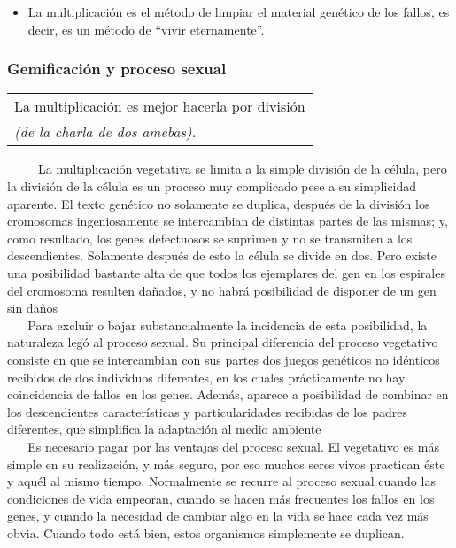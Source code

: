 \begin{itemize}
\tightlist
\item
  La multiplicación es el método de limpiar el material genético de los
  fallos, es decir, es un método de ``vivir eternamente''.
\end{itemize}

\protect\hypertarget{M2}{}{}

\subsubsection{Gemificación y proceso
sexual}\label{gemificaciuxf3n-y-proceso-sexual}

\begin{longtable}[]{@{}l@{}}
\toprule
La multiplicación es mejor hacerla por división\tabularnewline
\emph{(de la charla de dos amebas).}\tabularnewline
\bottomrule
\end{longtable}

~ ~ ~ La multiplicación vegetativa se limita a la simple división de la
célula, pero la división de la célula es un proceso muy complicado pese
a su simplicidad aparente. El texto genético no solamente se duplica,
después de la división los cromosomas ingeniosamente se intercambian de
distintas partes de las mismas; y, como resultado, los genes defectuosos
se suprimen y no se transmiten a los descendientes. Solamente después de
esto la célula se divide en dos. Pero existe una posibilidad bastante
alta de que todos los ejemplares del gen en los espirales del cromosoma
resulten dañados, y no habrá posibilidad de disponer de un gen sin
daños\\
\hspace*{0.333em} ~ ~ Para excluir o bajar substancialmente la
incidencia de esta posibilidad, la naturaleza legó al proceso sexual. Su
principal diferencia del proceso vegetativo consiste en que se
intercambian con sus partes dos juegos genéticos no idénticos recibidos
de dos individuos diferentes, en los cuales prácticamente no hay
coincidencia de fallos en los genes. Además, aparece a posibilidad de
combinar en los descendientes características y particularidades
recibidas de los padres diferentes, que simplifica la adaptación al
medio ambiente\\
\hspace*{0.333em} ~ ~ Es necesario pagar por las ventajas del proceso
sexual. El vegetativo es más simple en su realización, y más seguro, por
eso muchos seres vivos practican éste y aquél al mismo tiempo.
Normalmente se recurre al proceso sexual cuando las condiciones de vida
empeoran, cuando se hacen más frecuentes los fallos en los genes, y
cuando la necesidad de cambiar algo en la vida se hace cada vez más
obvia. Cuando todo está bien, estos organismos simplemente se duplican.

